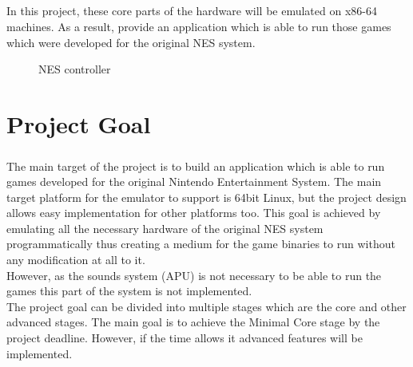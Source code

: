 \documentclass[]{report}
\begin{document}
\paragraph{ }
In this project, these core parts of the hardware will be emulated on x86-64 machines. As a result, provide an application which is able to run those games which were developed for the original NES system.

\begin{figure}[!htb]
	\caption{\label{fig:my-label} NES controller}
\end{figure}
\clearpage



\chapter{Project Goal}
\paragraph{ }
The main target of the project is to build an application which is able to run games developed for the original Nintendo Entertainment System. The main target platform for the emulator to support is 64bit Linux, but the project design allows easy implementation for other platforms too. This goal is achieved by emulating all the necessary hardware of the original NES system programmatically thus creating a medium for the game binaries to run without any modification at all to it. 
\\ 
However, as the sounds system (APU) is not necessary to be able to run the games this part of the system is not implemented.
\\
The project goal can be divided into multiple stages which are the core and other advanced stages.
The main goal is to achieve the Minimal Core stage by the project deadline. However, if the time allows it advanced features will be implemented. 
\end{document}
